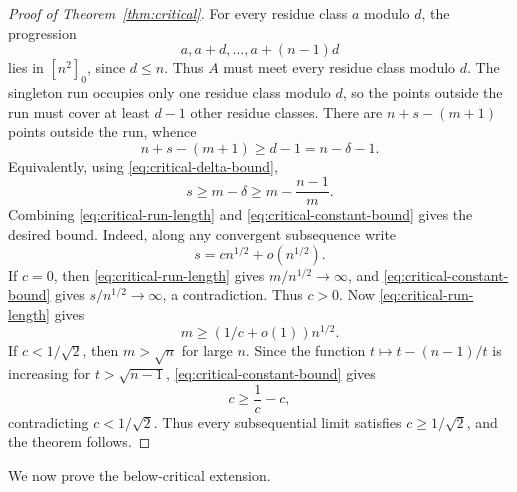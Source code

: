 \documentclass[11pt]{article}
\theoremstyle{remark}
\numberwithin{equation}{section}
\begin{document}
\begin{proof}[Proof of Theorem~\ref{thm:critical}]
For every residue class $a$ modulo $d$, the progression
\[
        a,
        a+d,
        \ldots,
        a+(n-1)d
\]
lies in $[n^2]_0$, since $d\le n$.
Thus $A$ must meet every residue class modulo $d$.
The singleton run occupies only one residue class modulo $d$, so the points outside the run must cover at least $d-1$ other residue classes.
There are $n+s-(m+1)$ points outside the run, whence
\[
        n+s-(m+1)
        \ge
        d-1
        =n-\delta-1.
\]
Equivalently, using \eqref{eq:critical-delta-bound},
\begin{equation}\label{eq:critical-constant-bound}
        s\ge m-\delta
        \ge
        m-\frac{n-1}{m}.
\end{equation}
Combining \eqref{eq:critical-run-length} and \eqref{eq:critical-constant-bound} gives the desired bound.
Indeed, along any convergent subsequence write
\[
        s=c n^{1/2}+o(n^{1/2}).
\]
If $c=0$, then \eqref{eq:critical-run-length} gives $m/n^{1/2}\to\infty$, and \eqref{eq:critical-constant-bound} gives $s/n^{1/2}\to\infty$, a contradiction.
Thus $c>0$.
Now \eqref{eq:critical-run-length} gives
\[
        m\ge (1/c+o(1))n^{1/2}.
\]
If $c<1/\sqrt2$, then $m>\sqrt n$ for large $n$.
Since the function $t\mapsto t-(n-1)/t$ is increasing for $t>\sqrt{n-1}$, \eqref{eq:critical-constant-bound} gives
\[
        c\ge \frac1c-c,
\]
contradicting $c<1/\sqrt2$.
Thus every subsequential limit satisfies $c\ge1/\sqrt2$, and the theorem follows.
\end{proof}

We now prove the below-critical extension.
\end{document}
